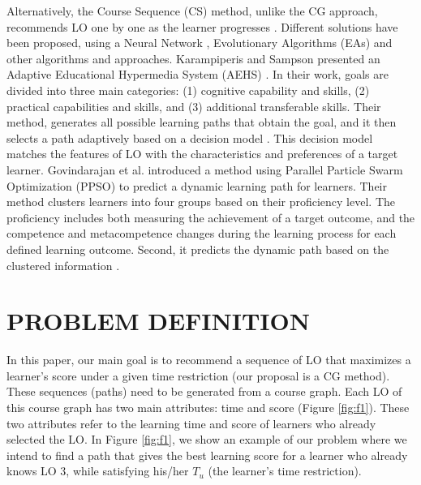 \documentclass{sig-alternate}
\begin{document}
Alternatively, the Course Sequence (CS) method, unlike the CG approach, recommends LO one by one as the learner progresses \cite{li2012self}. Different solutions have been proposed, using a Neural Network \cite{idris2009adaptive}, Evolutionary Algorithms (EAs) \cite{li2016coursenavigator} and other algorithms and approaches. Karampiperis and Sampson \cite{li2012self} presented an Adaptive Educational Hypermedia System (AEHS) \cite{brusilovsky1996methods}. In their work, goals are divided into three main categories: (1) cognitive capability and skills, (2) practical capabilities and skills, and (3) additional transferable skills. Their method, generates all possible learning paths that obtain the goal, and it then selects a path adaptively based on a decision model \cite{karampiperis2004adaptive}. This decision model matches the features of LO with the characteristics and preferences of a target learner. Govindarajan et al. introduced a method using Parallel Particle Swarm Optimization (PPSO) to predict a dynamic learning path for learners. Their method clusters learners into four groups based on their proficiency level. The proficiency includes both measuring the achievement of a target outcome, and the competence and metacompetence changes during the learning process for each defined learning outcome. Second, it predicts the dynamic path based on the clustered information \cite{govindarajan2016dynamic}.

\section{PROBLEM DEFINITION}
\label{sec:problemdefinition}
\noindent In this paper, our main goal is to recommend a sequence of LO that maximizes a learner’s score under a given time restriction (our proposal is a CG method). These sequences (paths) need to be generated from a course graph. Each LO of this course graph has two main attributes: time and score (Figure \ref{fig:f1}). These two attributes refer to the learning time and score of learners who already selected the LO. In Figure \ref{fig:f1}, we show an example of our problem where we intend to find a path that gives the best learning score for a learner who already knows LO 3, while satisfying his/her $T_u$ (the learner’s time restriction).
\end{document}
